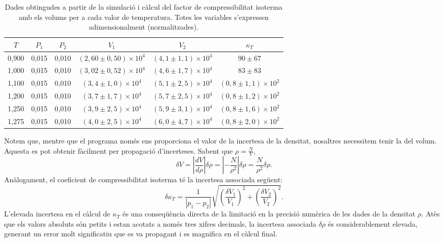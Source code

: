 \documentclass[a4paper,10.5pt]{report}
\begin{document}
\begin{table}[H]
	\centering
	\caption{Dades obtingudes a partir de la simulació i càlcul del factor de compressibilitat isoterma amb els volums per a cada valor de temperatura. Totes les variables s'expressen adimensionalment (normalitzades).}
	\label{kt_volum_gas}
		\begin{tabular}{cccccc}
			\toprule
			$T$ & $P_1$ & $P_2$ & $V_1 $ & $V_2 $  & $\kappa_T$ \\ 
			\midrule
			0,900   & 0,015 & 0,010 & $(2,60 \pm 0,50) \times 10^4$ & $(4,1 \pm 1,1) \times 10^4$ & $90 \pm 67$   \\
			1,000   & 0,015 & 0,010 & $(3,02 \pm 0,52) \times 10^4$ & $(4,6 \pm 1,7) \times 10^4$  & $83 \pm 83$   \\
			1,100   & 0,015 & 0,010 & $(3,4 \pm 1,0) \times 10^4$   & $(5,1 \pm 2,5) \times 10^4$  & $(0,8 \pm 1,1) \times 10^2$  \\
			1,200   & 0,015 & 0,010 & $(3,7 \pm 1,7) \times 10^4$   & $(5,7 \pm 2,5) \times 10^4$  & $(0,8 \pm 1,2) \times 10^2$  \\
			1,250   & 0,015 & 0,010 & $(3,9 \pm 2,5) \times 10^4$   & $(5,9 \pm 3,1) \times 10^4$  & $(0,8 \pm 1,6) \times 10^2$  \\
			1,275   & 0,015 & 0,010 & $(4,0 \pm 2,5) \times 10^4$   & $(6,0 \pm 4,7) \times 10^4$  & $(0,8 \pm 2,0) \times 10^2$  \\ 
			\bottomrule
		\end{tabular}%
	
\end{table}

Notem que, mentre que el programa només ens proporciona el valor de la incertesa de la densitat, nosaltres necessitem tenir la del volum. Aquesta es pot obtenir fàcilment per propagació d'incerteses. Sabent que $\rho=\frac{N}{V}$,
\begin{equation}
	\delta V = \left| \frac{dV}{d\rho} \right| \delta \rho= \left| -\frac{N}{\rho^2} \right| \delta \rho=\frac{N}{\rho^2} \delta \rho.
\end{equation}
Anàlogament, el coeficient de compressibilitat isoterma té la incertesa associada següent:
\begin{equation}
	\delta \kappa_T = \frac{1}{|p_1 - p_2|} \sqrt{\left(\frac{\delta V_1}{V_1}\right)^2 + \left(\frac{\delta V_2}{V_2}\right)^2}.
\end{equation}
L'elevada incertesa en el càlcul de $\kappa_T$ és una conseqüència directa de la limitació en la precisió numèrica de les dades de la densitat $\rho$. Atès que els valors absoluts són petits i estan acotats a només tres xifres decimals, la incertesa associada $\delta \rho$ és considerablement elevada, generant un error molt significatiu que es va propagant i es magnifica en el càlcul final.
\end{document}
